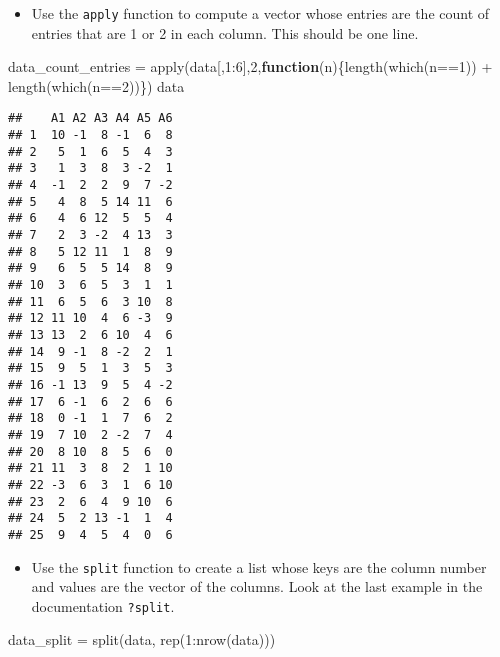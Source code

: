 \documentclass[
]{article}
\newenvironment{Shaded}{\begin{snugshade}}{\end{snugshade}}
\newcommand{\ControlFlowTok}[1]{\textcolor[rgb]{0.13,0.29,0.53}{\textbf{#1}}}
\newcommand{\DecValTok}[1]{\textcolor[rgb]{0.00,0.00,0.81}{#1}}
\newcommand{\FunctionTok}[1]{\textcolor[rgb]{0.00,0.00,0.00}{#1}}
\newcommand{\NormalTok}[1]{#1}
\newcommand{\OtherTok}[1]{\textcolor[rgb]{0.56,0.35,0.01}{#1}}
\newcommand{\SpecialCharTok}[1]{\textcolor[rgb]{0.00,0.00,0.00}{#1}}
\providecommand{\tightlist}{%
  \setlength{\itemsep}{0pt}\setlength{\parskip}{0pt}}
\begin{document}
\begin{itemize}
\tightlist
\item
  Use the \texttt{apply} function to compute a vector whose entries are
  the count of entries that are 1 or 2 in each column. This should be
  one line.
\end{itemize}

\begin{Shaded}
\begin{Highlighting}[]
\NormalTok{data\_count\_entries }\OtherTok{=} \FunctionTok{apply}\NormalTok{(data[,}\DecValTok{1}\SpecialCharTok{:}\DecValTok{6}\NormalTok{],}\DecValTok{2}\NormalTok{,}\ControlFlowTok{function}\NormalTok{(n)\{}\FunctionTok{length}\NormalTok{(}\FunctionTok{which}\NormalTok{(n}\SpecialCharTok{==}\DecValTok{1}\NormalTok{)) }\SpecialCharTok{+} \FunctionTok{length}\NormalTok{(}\FunctionTok{which}\NormalTok{(n}\SpecialCharTok{==}\DecValTok{2}\NormalTok{))\})}
\NormalTok{data}
\end{Highlighting}
\end{Shaded}

\begin{verbatim}
##    A1 A2 A3 A4 A5 A6
## 1  10 -1  8 -1  6  8
## 2   5  1  6  5  4  3
## 3   1  3  8  3 -2  1
## 4  -1  2  2  9  7 -2
## 5   4  8  5 14 11  6
## 6   4  6 12  5  5  4
## 7   2  3 -2  4 13  3
## 8   5 12 11  1  8  9
## 9   6  5  5 14  8  9
## 10  3  6  5  3  1  1
## 11  6  5  6  3 10  8
## 12 11 10  4  6 -3  9
## 13 13  2  6 10  4  6
## 14  9 -1  8 -2  2  1
## 15  9  5  1  3  5  3
## 16 -1 13  9  5  4 -2
## 17  6 -1  6  2  6  6
## 18  0 -1  1  7  6  2
## 19  7 10  2 -2  7  4
## 20  8 10  8  5  6  0
## 21 11  3  8  2  1 10
## 22 -3  6  3  1  6 10
## 23  2  6  4  9 10  6
## 24  5  2 13 -1  1  4
## 25  9  4  5  4  0  6
\end{verbatim}

\begin{itemize}
\tightlist
\item
  Use the \texttt{split} function to create a list whose keys are the
  column number and values are the vector of the columns. Look at the
  last example in the documentation \texttt{?split}.
\end{itemize}

\begin{Shaded}
\begin{Highlighting}[]
\NormalTok{data\_split }\OtherTok{=} \FunctionTok{split}\NormalTok{(data, }\FunctionTok{rep}\NormalTok{(}\DecValTok{1}\SpecialCharTok{:}\FunctionTok{nrow}\NormalTok{(data)))}
\end{Highlighting}
\end{Shaded}
\end{document}
